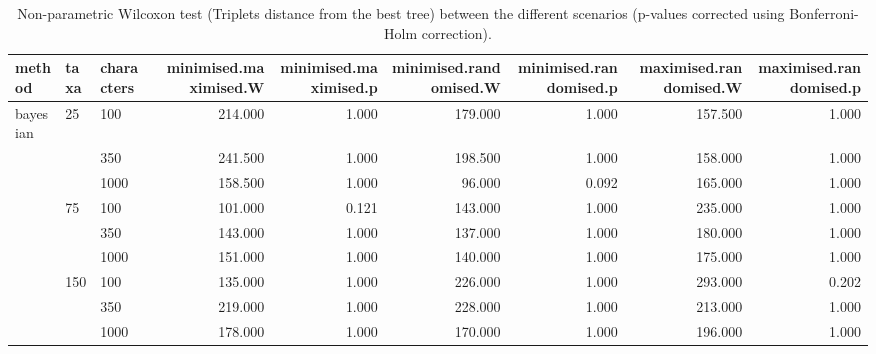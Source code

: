 \begin{table}[ht]
\centering
\begin{tabular}{lllrrrrrr}
  \hline
method & taxa & characters & minimised.maximised.W & minimised.maximised.p & minimised.randomised.W & minimised.randomised.p & maximised.randomised.W & maximised.randomised.p \\ 
  \hline
bayesian & 25 & 100 & 214.000 & 1.000 & 179.000 & 1.000 & 157.500 & 1.000 \\ 
   &  & 350 & 241.500 & 1.000 & 198.500 & 1.000 & 158.000 & 1.000 \\ 
   &  & 1000 & 158.500 & 1.000 & 96.000 & 0.092 & 165.000 & 1.000 \\ 
   & 75 & 100 & 101.000 & 0.121 & 143.000 & 1.000 & 235.000 & 1.000 \\ 
   &  & 350 & 143.000 & 1.000 & 137.000 & 1.000 & 180.000 & 1.000 \\ 
   &  & 1000 & 151.000 & 1.000 & 140.000 & 1.000 & 175.000 & 1.000 \\ 
   & 150 & 100 & 135.000 & 1.000 & 226.000 & 1.000 & 293.000 & 0.202 \\ 
   &  & 350 & 219.000 & 1.000 & 228.000 & 1.000 & 213.000 & 1.000 \\ 
   &  & 1000 & 178.000 & 1.000 & 170.000 & 1.000 & 196.000 & 1.000 \\ 
   \hline
\end{tabular}
\caption{Non-parametric Wilcoxon test (Triplets distance from the best tree) between the different scenarios (p-values corrected using Bonferroni-Holm correction).} 
\label{Full_Tab_Bayesian_WXTrbest}
\end{table}
